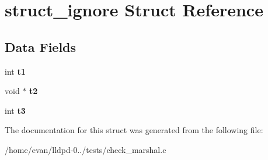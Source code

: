 \section{struct\-\_\-ignore \-Struct \-Reference}
\label{structstruct__ignore}
\subsection*{\-Data \-Fields}
\begin{DoxyCompactItemize}
\item 
int {\bfseries t1}\label{structstruct__ignore_a1f006058637a82726360f71ab3396f0e}

\item 
void $\ast$ {\bfseries t2}\label{structstruct__ignore_a93dfc1845f9c658b462d460562099508}

\item 
int {\bfseries t3}\label{structstruct__ignore_aa3dab92a44ebd1111b3878ce12441eed}

\end{DoxyCompactItemize}


\-The documentation for this struct was generated from the following file\-:\begin{DoxyCompactItemize}
\item 
/home/evan/lldpd-\/0../tests/check\-\_\-marshal.\-c\end{DoxyCompactItemize}

